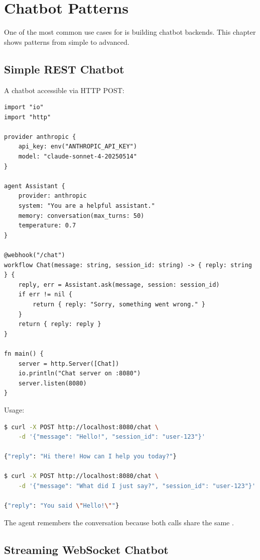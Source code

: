 \chapter{Chatbot Patterns}
\label{ch:chatbot}

One of the most common use cases for \haira{} is building chatbot backends. This chapter shows patterns from simple to advanced.

\section{Simple REST Chatbot}

A chatbot accessible via HTTP POST:

\begin{lstlisting}
import "io"
import "http"

provider anthropic {
    api_key: env("ANTHROPIC_API_KEY")
    model: "claude-sonnet-4-20250514"
}

agent Assistant {
    provider: anthropic
    system: "You are a helpful assistant."
    memory: conversation(max_turns: 50)
    temperature: 0.7
}

@webhook("/chat")
workflow Chat(message: string, session_id: string) -> { reply: string } {
    reply, err = Assistant.ask(message, session: session_id)
    if err != nil {
        return { reply: "Sorry, something went wrong." }
    }
    return { reply: reply }
}

fn main() {
    server = http.Server([Chat])
    io.println("Chat server on :8080")
    server.listen(8080)
}
\end{lstlisting}

Usage:

\begin{lstlisting}[language=bash,numbers=none]
$ curl -X POST http://localhost:8080/chat \
    -d '{"message": "Hello!", "session_id": "user-123"}'

{"reply": "Hi there! How can I help you today?"}

$ curl -X POST http://localhost:8080/chat \
    -d '{"message": "What did I just say?", "session_id": "user-123"}'

{"reply": "You said \"Hello!\""}
\end{lstlisting}

The agent remembers the conversation because both calls share the same .

\section{Streaming WebSocket Chatbot}


